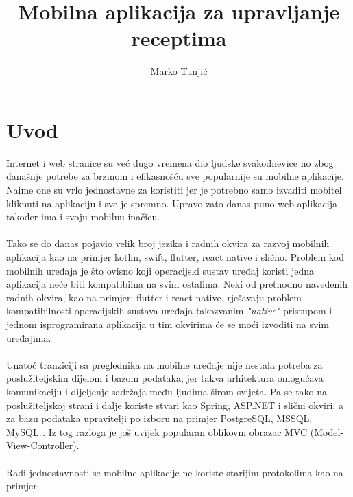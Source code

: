 \documentclass[times, utf8, zavrsni]{fer}
\begin{document}

\title{Mobilna aplikacija za upravljanje receptima}

\author{Marko Tunjić}

\maketitle

\zahvala{}

\tableofcontents

\chapter{Uvod}
Internet i web stranice su već dugo vremena dio ljudske svakodnevice no zbog
današnje potrebe za brzinom i efikasnošću sve popularnije su mobilne aplikacije. Naime one
su vrlo jednostavne za koristiti jer je potrebno samo izvaditi mobitel
kliknuti na aplikaciju i sve je spremno. Upravo zato danas puno web aplikacija
također ima i svoju mobilnu inačicu.
\\\\
Tako se do danas pojavio velik broj jezika
i radnih okvira za razvoj mobilnih aplikacija kao na primjer kotlin, swift, flutter,
react native i slično. Problem kod mobilnih uređaja je što ovisno koji operacijski
sustav uređaj koristi jedna aplikacija neće biti kompatibilna na svim ostalima.
Neki od prethodno navedenih radnih okvira, kao na primjer: flutter i react native,
rješavaju problem kompatibilnosti operacijskih sustava uređaja takozvanim \textit{"native"} pristupom
i jednom isprogramirana aplikacija u tim okvirima će se moći izvoditi na svim uređajima.
\\\\
Unatoč tranziciji sa preglednika na mobilne uređaje nije nestala potreba
za poslužiteljskim dijelom i bazom podataka, jer takva arhitektura omogućava
komunikaciju i dijeljenje sadržaja među ljudima širom svijeta. Pa se tako na
poslužiteljskoj strani i dalje koriste stvari kao Spring, ASP.NET i slični okviri,
a za bazu podataka upravitelji po izboru na primjer PostgreSQL, MSSQL, MySQL\dots
Iz tog razloga je još uvijek popularan oblikovni obrazac MVC (Model-View-Controller).
\\\\
Radi jednostavnosti se mobilne aplikacije ne koriste starijim protokolima kao na primjer
\end{document}

